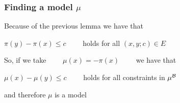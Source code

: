 \begin{frame}
  \frametitle{Finding a model $\mu$}

  Because of the previous lemma we have that
  \vfill
  \begin{center}
    $\pi(y) - \pi(x) \leq c\quad\quad$ holds for all $(x,y;c) \in E$
  \end{center}
  \vfill
  So, if we take $\quad\quad\mu(x) = -\pi(x)\quad\quad$ we have that
  \vfill
  \begin{center}
    $\mu(x) - \mu(y) \leq c\quad\quad$ holds for all constraints in $\mu^{\mathcal{B}}$
  \end{center}
  \vfill
  and therefore $\mu$ is a model

\end{frame}
